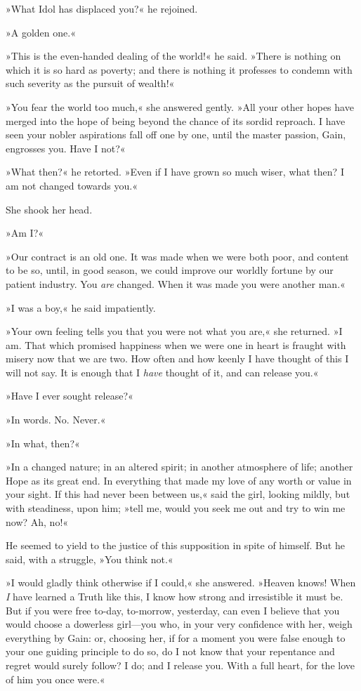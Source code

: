 »What Idol has displaced you?« he rejoined.

»A golden one.«

»This is the even-handed dealing of the world!« he said. »There is nothing on which it is so hard as poverty; and there is nothing it professes to condemn with such severity as the pursuit of wealth!«

»You fear the world too much,« she answered gently. »All your other hopes have merged into the hope of being beyond the chance of its sordid reproach. I have seen your nobler aspirations fall off one by one, until the master passion, Gain, engrosses you. Have I not?«

»What then?« he retorted. »Even if I have grown so much wiser, what then? I am not changed towards you.«

She shook her head.

»Am I?«

»Our contract is an old one. It was made when we were both poor, and content to be so, until, in good season, we could improve our worldly fortune by our patient industry. You \textit{are} changed. When it was made you were another man.«

»I was a boy,« he said impatiently.

»Your own feeling tells you that you were not what you are,« she returned. »I am. That which promised happiness when we were one in heart is fraught with misery now that we are two. How often and how keenly I have thought of this I will not say. It is enough that I \textit{have} thought of it, and can release you.«

»Have I ever sought release?«

»In words. No. Never.«

»In what, then?«

»In a changed nature; in an altered spirit; in another atmosphere of life; another Hope as its great end. In everything that made my love of any worth or value in your sight. If this had never been between us,« said the girl, looking mildly, but with steadiness, upon him; »tell me, would you seek me out and try to win me now? Ah, no!«

He seemed to yield to the justice of this supposition in spite of himself. But he said, with a struggle, »You think not.«

»I would gladly think otherwise if I could,« she answered. »Heav\-en knows! When \textit{I} have learned a Truth like this, I know how strong and irresistible it must be. But if you were free to-day, to-morrow, yesterday, can even I believe that you would choose a dowerless girl---you who, in your very confidence with her, weigh everything by Gain: or, choosing her, if for a moment you were false enough to your one guiding principle to do so, do I not know that your repentance and regret would surely follow? I do; and I release you. With a full heart, for the love of him you once were.«

